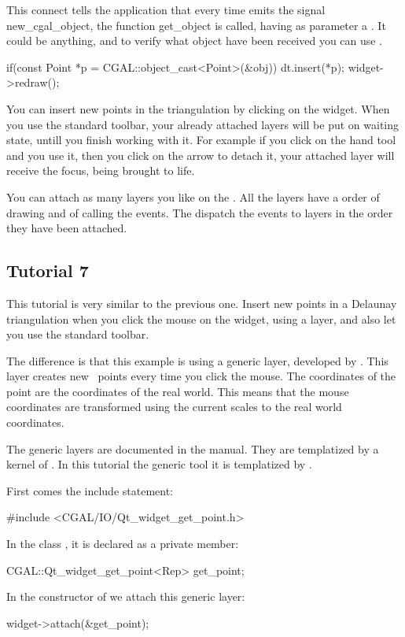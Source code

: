 This connect tells the application that every time
 emits the signal new\_cgal\_object, the function
get\_object is called, having as parameter a . It could be
anything, and to verify what object have been received you can use
.
\begin{ccExampleCode}
  if(const Point *p = CGAL::object_cast<Point>(&obj)) {
      dt.insert(*p);
      widget->redraw();
  }
\end{ccExampleCode}
You can insert new points in the triangulation by clicking on the
widget. When you use the standard toolbar, your already attached layers
will be put on waiting state, untill you finish working with it. For
example if you click on the hand tool and you use it, then you click
on the arrow to detach it, your attached layer will receive the
focus, being brought to life.

You can attach as many layers you like on the . All
the layers have a order of drawing and of calling the events. The
 dispatch the events to layers in the order they have
been attached.

\subsection*{Tutorial 7}

This tutorial is very similar to the previous one. Insert new points
in a Delaunay triangulation when you click the mouse on the widget,
using a layer, and also let you use the standard toolbar.

The difference is that this example is using a generic layer, developed
by \cgal. This layer creates new \cgal\ points every time you click the
mouse. The coordinates of the point are the coordinates of the real
world. This means that the mouse coordinates are transformed using the
current scales to the real world coordinates.

The generic layers are documented in the manual. They are templatized
by a kernel of \cgal. In this tutorial the generic tool
 it is templatized by
.

First comes the include statement:
\begin{ccExampleCode}
#include <CGAL/IO/Qt_widget_get_point.h>
\end{ccExampleCode}
In the class , it is declared as a private member:
\begin{ccExampleCode}
CGAL::Qt_widget_get_point<Rep> get_point;
\end{ccExampleCode}
In the constructor of  we attach this generic layer:
\begin{ccExampleCode}
widget->attach(&get_point);
\end{ccExampleCode}

